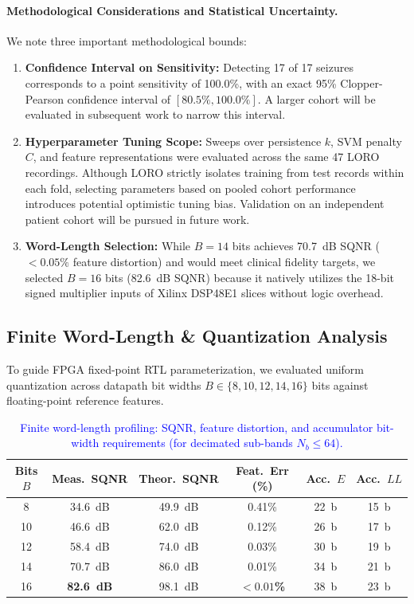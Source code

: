 \documentclass[10pt,twocolumn,letterpaper]{article}
\begin{document}
{\paragraph{Methodological Considerations and Statistical Uncertainty.}
We note three important methodological bounds:
\begin{enumerate}
    \item \textbf{Confidence Interval on Sensitivity:} Detecting 17 of 17 seizures corresponds to a point sensitivity of 100.0\%, with an exact 95\% Clopper-Pearson confidence interval of $[80.5\%, 100.0\%]$. A larger cohort will be evaluated in subsequent work to narrow this interval.
    \item \textbf{Hyperparameter Tuning Scope:} Sweeps over persistence $k$, SVM penalty $C$, and feature representations were evaluated across the same 47 LORO recordings. Although LORO strictly isolates training from test records within each fold, selecting parameters based on pooled cohort performance introduces potential optimistic tuning bias. Validation on an independent patient cohort will be pursued in future work.
    \item \textbf{Word-Length Selection:} While $B=14$ bits achieves 70.7~dB SQNR ($<0.05\%$ feature distortion) and would meet clinical fidelity targets, we selected $B=16$ bits (82.6~dB SQNR) because it natively utilizes the 18-bit signed multiplier inputs of Xilinx DSP48E1 slices without logic overhead.
\end{enumerate}

\subsection{Finite Word-Length \& Quantization Analysis}
To guide FPGA fixed-point RTL parameterization, we evaluated uniform quantization across datapath bit widths $B \in \{8, 10, 12, 14, 16\}$ bits against floating-point reference features.

\begin{table}[h]
\centering
\footnotesize
\setlength{\tabcolsep}{2.5pt}
\color{blue}
\caption{\textcolor{blue}{Finite word-length profiling: SQNR, feature distortion, and accumulator bit-width requirements (for decimated sub-bands $N_b \le 64$).}}
\label{tab:wordlength}
\begin{tabular}{cccccc}
\toprule
\textbf{Bits $B$} & \textbf{Meas.\ SQNR} & \textbf{Theor.\ SQNR} & \textbf{Feat.\ Err (\%)} & \textbf{Acc.\ $E$} & \textbf{Acc.\ $LL$} \\
\midrule
8  & 34.6~dB & 49.9~dB & 0.41\% & 22~b & 15~b \\
10 & 46.6~dB & 62.0~dB & 0.12\% & 26~b & 17~b \\
12 & 58.4~dB & 74.0~dB & 0.03\% & 30~b & 19~b \\
14 & 70.7~dB & 86.0~dB & 0.01\% & 34~b & 21~b \\
16 & \textbf{82.6~dB} & 98.1~dB & \textbf{$<0.01$\%} & 38~b & 23~b \\
\bottomrule
\end{tabular}
\end{table}

}
\end{document}

